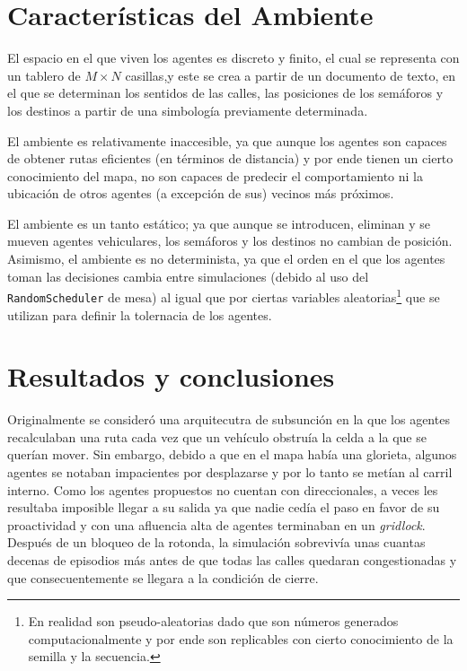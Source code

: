 \documentclass[twoside,11pt]{article}
\begin{document}
\section{Características del Ambiente}
El espacio en el que viven los agentes es discreto y finito, el cual se representa con un 
tablero de $M\times N$ casillas,y este se crea a partir de un documento de texto, en el 
que se determinan los sentidos de las calles, las posiciones de los semáforos y los destinos
a partir de una simbología previamente determinada. 

El ambiente es relativamente inaccesible, ya que aunque los agentes son capaces de obtener
rutas eficientes (en términos de distancia) y por ende tienen un cierto conocimiento del mapa,
no son capaces de predecir el comportamiento ni la ubicación de otros agentes (a excepción de sus)
vecinos más próximos. 

El ambiente es un tanto estático; ya que aunque se introducen, eliminan y se mueven agentes vehiculares,
los semáforos y los destinos no cambian de posición. Asimismo, el ambiente es no determinista, ya que
el orden en el que los agentes toman las decisiones cambia entre simulaciones (debido al uso del {\tt{RandomScheduler}} de 
mesa) al igual que por ciertas variables aleatorias\footnote{En realidad son pseudo-aleatorias dado que son números generados computacionalmente y por ende son replicables con cierto conocimiento de la semilla y la secuencia.} que se utilizan para definir la tolernacia de los agentes.

\section{Resultados y conclusiones}

Originalmente se consideró una arquitecutra de subsunción en la que los agentes recalculaban una ruta cada vez que un vehículo obstruía la celda
a la que se querían mover. Sin embargo, debido a que en el mapa había una glorieta, algunos agentes se notaban impacientes por desplazarse y por lo tanto se metían al
carril interno. Como los agentes propuestos no cuentan con direccionales, a veces les resultaba imposible llegar a su salida ya que nadie cedía el paso en favor de su proactividad
y con una afluencia alta de agentes terminaban en un \textit{gridlock}. Después de un bloqueo de la rotonda, la simulación sobrevivía unas cuantas decenas de episodios más antes de 
que todas las calles quedaran congestionadas y que consecuentemente se llegara a la condición de cierre.
\end{document}
